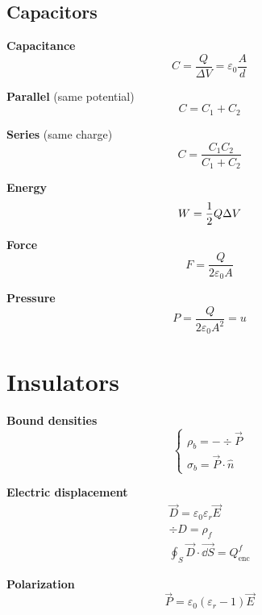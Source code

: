 \documentclass[10pt]{extarticle}
\numberwithin{equation}{section}
\begin{document}
\begin{multicols}{2}
    \subsection{Capacitors}

    \textbf{Capacitance}
    \begin{equation}
        C = \frac{Q }{\Delta V} = \varepsilon_0 \frac{A}{d}
    \end{equation}

    \textbf{Parallel} (same potential)
    \begin{equation}
        C = C_1 + C_2
    \end{equation}

    \textbf{Series} (same charge)
    \begin{equation}
        C = \frac{C_1 C_2}{C_1 + C_2}
    \end{equation}

    \textbf{Energy}
    \begin{equation}
        W = \frac{1}{2} Q \Delta V
    \end{equation}

    \textbf{Force}
    \begin{equation}
        F = \frac{Q}{2 \varepsilon_0 A}
    \end{equation}

    \textbf{Pressure}
    \begin{equation}
        P = \frac{Q}{2 \varepsilon_0 A^2} = u
    \end{equation}

    \section{Insulators}

    \textbf{Bound densities}
    \begin{equation}
        \begin{cases}
            \rho_b = -\div \vec P \\
            \sigma_b = \vec P \cdot \hat n
        \end{cases}
    \end{equation}

    \textbf{Electric displacement}
    \begin{gather}
        \vec D = \varepsilon_0 \varepsilon_r \vec E \\
        \div D = \rho_f \\
        \oint_S \vec D \cdot \vec{\dd S} = Q_\text{enc}^f
    \end{gather}

    \textbf{Polarization}
    \begin{equation}
        \vec P = \varepsilon_0 (\varepsilon_r-1) \vec E
    \end{equation}

\end{multicols}
\end{document}
